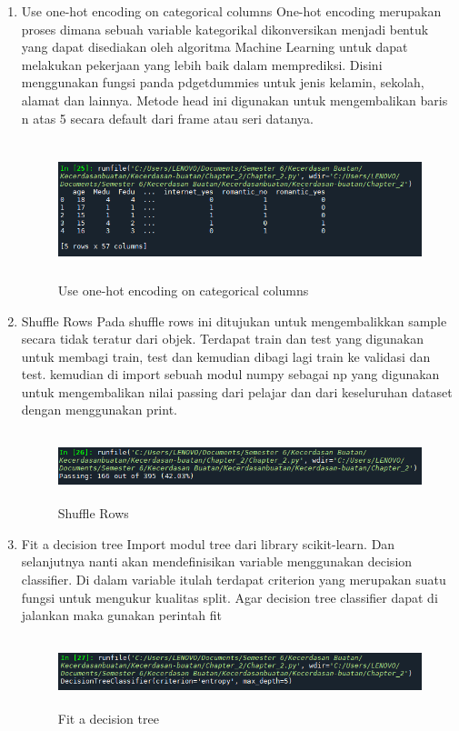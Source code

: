 \begin{enumerate}
\item Use one-hot encoding on categorical columns 
\newline One-hot encoding merupakan proses dimana sebuah variable kategorikal dikonversikan menjadi bentuk yang dapat disediakan oleh algoritma Machine Learning untuk dapat melakukan pekerjaan yang lebih baik dalam memprediksi. Disini menggunakan fungsi panda pdgetdummies untuk jenis kelamin, sekolah, alamat dan lainnya. Metode head ini digunakan untuk mengembalikan baris n atas 5 secara default dari frame atau seri datanya.
\begin{figure}[!htbp]
	\centering
	\includegraphics[width=12cm,height=4cm]{figures/Cp2-c.png}
	\caption{Use one-hot encoding on categorical columns}
	\label{penanda}
\end{figure}

\item Shuffle Rows
\newline Pada shuffle rows ini ditujukan untuk mengembalikkan sample secara tidak teratur dari objek. Terdapat train dan test yang digunakan untuk membagi train, test dan kemudian dibagi lagi train ke validasi dan test. kemudian di import sebuah modul numpy sebagai np yang digunakan untuk mengembalikan nilai passing dari pelajar dan dari keseluruhan dataset dengan menggunakan print.
\begin{figure}[!htbp]
	\centering
	\includegraphics[width=14cm,height=2cm]{figures/Cp2-d.png}
	\caption{Shuffle Rows}
	\label{penanda}
\end{figure}

\item Fit a decision tree
\newline Import modul tree dari library scikit-learn. Dan selanjutnya nanti akan mendefinisikan variable menggunakan decision classifier. Di dalam variable itulah terdapat criterion yang merupakan suatu fungsi untuk mengukur kualitas split. Agar decision tree classifier dapat di jalankan maka gunakan perintah fit
\begin{figure}[!htbp]
	\centering
	\includegraphics[width=14cm,height=2cm]{figures/Cp2-e.png}
	\caption{Fit a decision tree}
	\label{penanda}
\end{figure}


\end{enumerate}
